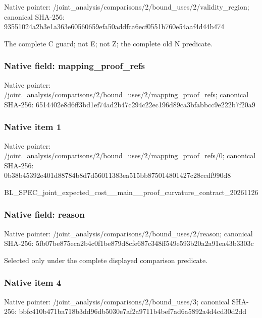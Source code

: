 \documentclass[10pt,a4paper]{article}
\begin{document}
Native pointer: /joint\_analysis/comparis\allowbreak{}ons/2/bound\_uses/2/valid\allowbreak{}ity\_region; canonical SHA-256: 93551024a2b3e1a363e60560\allowbreak{}659efa50addfca6ecf0551b7\allowbreak{}60e54aaf4d44b474


The complete C guard; not E; not Z; the complete old N predicate.


\subsubsection{Native field: mapping\_proof\_refs}


Native pointer: /joint\_analysis/comparis\allowbreak{}ons/2/bound\_uses/2/mappi\allowbreak{}ng\_proof\_refs; canonical SHA-256: 6514402e8d6ff3bd1ef74ad2\allowbreak{}b47c294c22ec196d89ca3bfa\allowbreak{}bbcc9e222b7f20a9



\subsubsection{Native item 1}


Native pointer: /joint\_analysis/comparis\allowbreak{}ons/2/bound\_uses/2/mappi\allowbreak{}ng\_proof\_refs/0; canonical SHA-256: 0b38b45392e401d88784b8d7\allowbreak{}d56011383ea515bb87501480\allowbreak{}1427c28ccdf990d8


BL\_SPEC\_joint\_expected\_c\allowbreak{}ost\_\_main\_\_proof\_curvatu\allowbreak{}re\_contract\_20261126


\subsubsection{Native field: reason}


Native pointer: /joint\_analysis/comparis\allowbreak{}ons/2/bound\_uses/2/reaso\allowbreak{}n; canonical SHA-256: 5fb07be875eca2b4c0f1be87\allowbreak{}9d8cfe687c348ff549e593b2\allowbreak{}0a2a91ea43b3303c


Selected only under the complete displayed comparison predicate.


\subsubsection{Native item 4}


Native pointer: /joint\_analysis/comparis\allowbreak{}ons/2/bound\_uses/3; canonical SHA-256: bbfc410b471ba718b3dd96db\allowbreak{}5030e7af2a9711b4bef7ad6a\allowbreak{}5892a4d4cd30d2dd
\end{document}
